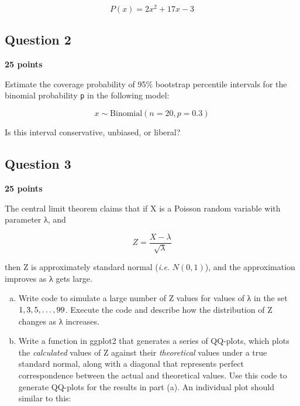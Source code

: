 \documentclass[]{article}
\begin{document}
\[P(x) = 2x^{2} +17x−3\]

\subsection{Question 2}

\textbf{25 points}

Estimate the coverage probability of 95\% bootstrap percentile intervals
for the binomial probability \texttt{p} in the following model:

\[x \sim \text{Binomial}(n=20, p=0.3)\]

Is this interval conservative, unbiased, or liberal?

\subsection{Question 3}

\textbf{25 points}

The central limit theorem claims that if X is a Poisson random variable
with parameter λ, and

\[Z = \frac{X-\lambda}{\sqrt{\lambda}}\]

then Z is approximately standard normal (\emph{i.e.} $N(0,1)$), and the
approximation improves as λ gets large.

\begin{enumerate}[a.]
\item
  Write code to simulate a large number of Z values for values of λ in
  the set $\\{1,3,5,\ldots,99\\}$. Execute the code and describe how the
  distribution of Z changes as λ increases.
\item
  Write a function in ggplot2 that generates a series of QQ-plots, which
  plots the \emph{calculated} values of Z against their
  \emph{theoretical} values under a true standard normal, along with a
  diagonal that represents perfect correspondence between the actual and
  theoretical values. Use this code to generate QQ-plots for the results
  in part (a). An individual plot should similar to this:
\end{enumerate}
\end{document}
